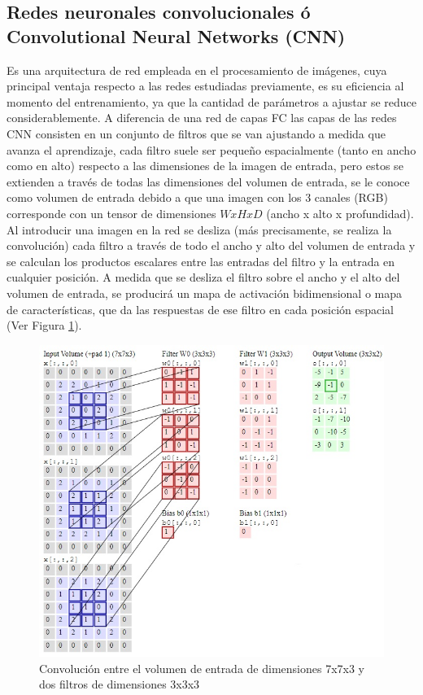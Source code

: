 \subsection{Redes neuronales convolucionales ó Convolutional Neural Networks (CNN)}
Es una arquitectura de red empleada en el procesamiento de imágenes, cuya principal ventaja respecto a las redes estudiadas previamente, es su eficiencia al momento del entrenamiento, ya que la cantidad de parámetros a ajustar se reduce considerablemente. A diferencia de una red de capas FC las capas de las redes CNN consisten en un conjunto de filtros que se van ajustando a medida que avanza el aprendizaje, cada filtro suele ser pequeño espacialmente (tanto en ancho como en alto) respecto a las dimensiones de la imagen de entrada, pero estos se extienden a través de todas las dimensiones del volumen de entrada, se le conoce como volumen de entrada debido a que una imagen con los 3 canales (RGB) corresponde con un tensor de dimensiones $WxHxD$ (ancho x alto x profundidad). Al introducir una imagen en la red se desliza (más precisamente, se realiza la convolución) cada filtro a través de todo el ancho y alto del volumen de entrada y se calculan los productos escalares entre las entradas del filtro y la entrada en cualquier posición.  A medida que se desliza el filtro sobre el ancho y el alto del volumen de entrada, se producirá un mapa de activación bidimensional o mapa de características, que da las respuestas de ese filtro en cada posición espacial (Ver Figura \ref{fowardPassCNN}).
\begin{figure}[H]
    \centering
    \includegraphics[scale=0.7]{Recursos/fowardPassCNN.jpg}
    \caption{Convolución entre el volumen de entrada de dimensiones 7x7x3 y dos filtros de dimensiones 3x3x3}
    \label{fowardPassCNN}
\end{figure}
